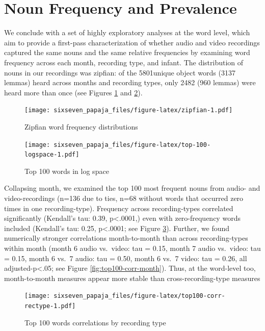 \documentclass[floatsintext,man]{apa6}
\theoremstyle{definition}
\theoremstyle{definition}
\theoremstyle{definition}
\theoremstyle{remark}
\begin{document}
\section{Noun Frequency and
Prevalence}\label{noun-frequency-and-prevalence}

We conclude with a set of highly exploratory analyses at the word level,
which aim to provide a first-pass characterization of whether audio and
video recordings captured the same nouns and the same relative
frequencies by examining word frequency across each month, recording
type, and infant. The distribution of nouns in our recordings was
zipfian: of the 5801unique object words (3137 lemmas) heard across
months and recording types, only 2482 (960 lemmas) were heard more than
once (see Figures \ref{fig:zipfian} and \ref{fig:top-100-logspace}).

\begin{figure}[htbp]
\centering
\texttt{[image: sixseven\_papaja\_files/figure-latex/zipfian-1.pdf]}
\caption{\label{fig:zipfian}Zipfian word frequency distributions}
\end{figure}

\begin{figure}[htbp]
\centering
\texttt{[image: sixseven\_papaja\_files/figure-latex/top-100-logspace-1.pdf]}
\caption{\label{fig:top-100-logspace}Top 100 words in log space}
\end{figure}

Collapsing month, we examined the top 100 most frequent nouns from
audio- and video-recordings (n=136 due to ties, n=68 without words that
occurred zero times in one recording-type). Frequency across
recording-types correlated significantly (Kendall's tau: 0.39,
p\textless{}.0001,) even with zero-frequency words included (Kendall's
tau: 0.25, p\textless{}.0001; see Figure \ref{fig:top100-corr-rectype}).
Further, we found numerically stronger correlations month-to-month than
across recording-types within month (month 6 audio vs.~video: tau =
0.15, month 7 audio vs.~video: tau = 0.15, month 6 vs.~7 audio: tau =
0.50, month 6 vs.~7 video: tau = 0.26, all adjusted-p\textless{}.05; see
Figure \ref{fig:top100-corr-month}). Thus, at the word-level too,
month-to-month measures appear more stable than cross-recording-type
measures

\begin{figure}[htbp]
\centering
\texttt{[image: sixseven\_papaja\_files/figure-latex/top100-corr-rectype-1.pdf]}
\caption{\label{fig:top100-corr-rectype}Top 100 words correlations by
recording type}
\end{figure}
\end{document}
